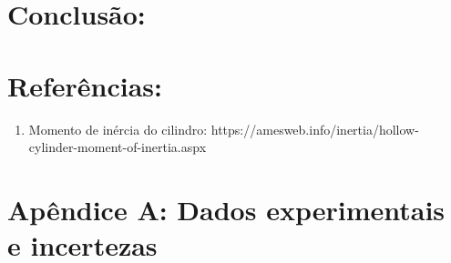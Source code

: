 \documentclass[hidelinks,a4paper,12pt]{article}
\begin{document}
\section*{Conclusão:}

\section*{Referências:}
\begin{enumerate}
    \item Momento de inércia do cilindro: https://amesweb.info/inertia/hollow-cylinder-moment-of-inertia.aspx
\end{enumerate}

\section*{Apêndice A: Dados experimentais e incertezas}
\end{document}
